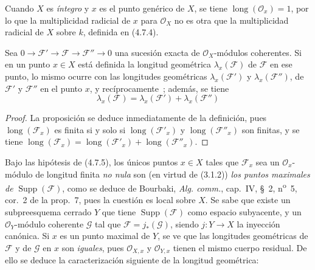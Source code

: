 Cuando $X$ es \emph{íntegro} y $x$ es el punto genérico de $X$, se tiene
$\operatorname{long}(\mathcal O_x)=1$, por lo que la multiplicidad radicial de
$x$ para $\mathcal O_X$ no es otra que la multiplicidad radicial de $X$ sobre
$k$, definida en (4.7.4).


\begin{proposition}[4.7.6]
\label{IV.2.4.7.6-fr}
Sea
$0\boldsymbol{\longrightarrow}\mathscr F'\longrightarrow\mathscr F
\longrightarrow\mathscr F''\longrightarrow0$
una sucesión exacta de $\mathcal O_X$-módulos coherentes. Si en un punto
$x\in X$ está definida la longitud geométrica $\lambda_x(\mathscr F)$ de
$\mathscr F$ en ese punto, lo mismo ocurre con las longitudes geométricas
$\lambda_x(\mathscr F')$ y $\lambda_x(\mathscr F'')$, de $\mathscr F'$ y
$\mathscr F''$ en el punto $x$, y recíprocamente~; además, se tiene
\begin{equation}
\lambda_x(\mathscr F)=\lambda_x(\mathscr F')+\lambda_x(\mathscr F'')
\tag{4.7.6.1}
\label{IV.2.4.7.6.1-fr}
\end{equation}
\end{proposition}

\begin{proof}
La proposición se deduce inmediatamente de la definición, pues
$\operatorname{long}(\mathscr F_x)$ es finita si y solo si
$\operatorname{long}(\mathscr F'_x)$ y
$\operatorname{long}(\mathscr F''_x)$ son finitas, y se tiene
$\operatorname{long}(\mathscr F_x)
=\operatorname{long}(\mathscr F'_x)+\operatorname{long}(\mathscr F''_x)$.
\end{proof}

\begin{env}[4.7.7]
\label{IV.2.4.7.7-fr}
Bajo las hipótesis de (4.7.5), los únicos puntos $x\in X$ tales que
$\mathscr F_x$ sea un $\mathcal O_x$-módulo de longitud finita \emph{no nula} son
(en virtud de (3.1.2)) \emph{los puntos maximales de}
$\operatorname{Supp}(\mathscr F)$, como se deduce de Bourbaki,
\emph{Alg. comm.}, cap.~IV, \S~2, n\textsuperscript{o}~5, cor.~2 de la
prop.~7, pues la cuestión es local sobre $X$. Se sabe que existe un
subpreesquema cerrado $Y$ que tiene $\operatorname{Supp}(\mathscr F)$ como
espacio subyacente, y un $\mathcal O_Y$-módulo coherente $\mathscr G$ tal que
$\mathscr F=j_*(\mathscr G)$, siendo $j:Y\to X$ la inyección canónica. Si $x$
es un punto maximal de $Y$, se ve que las longitudes geométricas de
$\mathscr F$ y de $\mathscr G$ en $x$ son \emph{iguales}, pues $\mathcal O_{X,x}$ y
$\mathcal O_{Y,x}$ tienen el mismo cuerpo residual. De ello se deduce la
caracterización siguiente de la longitud geométrica:
\end{env}

